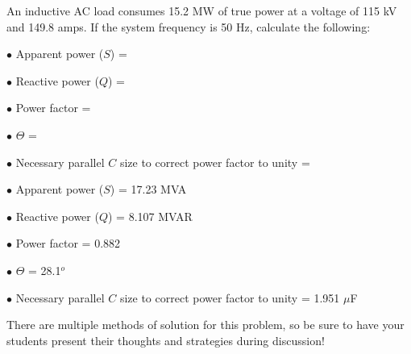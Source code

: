 

An inductive AC load consumes 15.2 MW of true power at a voltage of 115 kV and 149.8 amps.  If the system frequency is 50 Hz, calculate the following:

\medskip
\goodbreak
\item{$\bullet$} Apparent power ($S$) =
\item{$\bullet$} Reactive power ($Q$) =
\item{$\bullet$} Power factor =
\item{$\bullet$} $\Theta$ =
\item{$\bullet$} Necessary parallel $C$ size to correct power factor to unity = 
\medskip







\medskip
\goodbreak
\item{$\bullet$} Apparent power ($S$) = 17.23 MVA
\item{$\bullet$} Reactive power ($Q$) = 8.107 MVAR
\item{$\bullet$} Power factor = 0.882
\item{$\bullet$} $\Theta$ = 28.1$^{o}$
\item{$\bullet$} Necessary parallel $C$ size to correct power factor to unity = 1.951 $\mu$F
\medskip







There are multiple methods of solution for this problem, so be sure to have your students present their thoughts and strategies during discussion!




